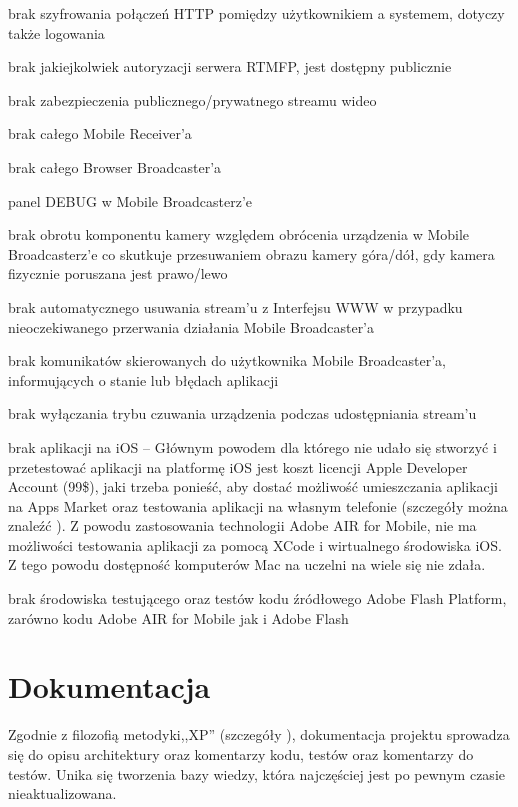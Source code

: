 \begin{packed_item}
    \item{brak szyfrowania połączeń HTTP pomiędzy użytkownikiem a systemem, dotyczy także logowania}
    \item{brak jakiejkolwiek autoryzacji serwera RTMFP, jest dostępny publicznie}
    \item{brak zabezpieczenia publicznego/prywatnego streamu wideo}
    \item{brak całego Mobile Receiver'a}
    \item{brak całego Browser Broadcaster'a}
    \item{panel DEBUG w Mobile Broadcasterz'e}
    \item{brak obrotu komponentu kamery względem obrócenia urządzenia w Mobile Broadcasterz'e co skutkuje przesuwaniem obrazu kamery góra/dół, gdy kamera fizycznie poruszana jest prawo/lewo}
    \item{brak automatycznego usuwania stream'u z Interfejsu WWW w przypadku nieoczekiwanego przerwania działania Mobile Broadcaster'a}
    \item{brak komunikatów skierowanych do użytkownika Mobile Broadcaster'a, informujących o stanie lub błędach aplikacji}
    \item{brak wyłączania trybu czuwania urządzenia podczas udostępniania stream'u}
    \item{brak aplikacji na iOS -- Głównym powodem dla którego nie udało się stworzyć i przetestować aplikacji na platformę iOS jest koszt licencji Apple Developer Account (99\$), jaki trzeba ponieść, aby dostać możliwość umieszczania aplikacji na Apps Market oraz testowania aplikacji na własnym telefonie (szczegóły można znaleźć \cite{UnknAuth11}). Z powodu zastosowania technologii Adobe AIR for Mobile, nie ma możliwości testowania aplikacji za pomocą XCode i wirtualnego środowiska iOS. Z tego powodu dostępność komputerów Mac na uczelni na wiele się nie zdała. }
    \item{brak środowiska testującego oraz testów kodu źródłowego Adobe Flash Platform, zarówno kodu Adobe AIR for Mobile jak i Adobe Flash}
\end{packed_item}

\newpage
\section{Dokumentacja}
Zgodnie z filozofią metodyki,,XP'' (szczegóły ), dokumentacja projektu sprowadza się do opisu architektury oraz komentarzy kodu, testów oraz komentarzy do testów. Unika się tworzenia bazy wiedzy, która najczęściej jest po pewnym czasie nieaktualizowana.

